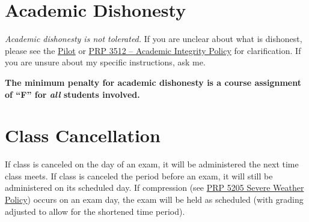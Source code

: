 \documentclass[11pt,letterpaper]{article}
\begin{document}
\begin{enumerate}
\end{enumerate}

\section{Academic Dishonesty}
\emph{Academic dishonesty is not tolerated.} If you are unclear about what is
dishonest, please see the
\href{https://intranet.bloomu.edu/documents/student/Pilot.pdf}{Pilot} or
\href{https://intranet.bloomu.edu/policies_procedures/3512}{PRP 3512 --
	Academic Integrity Policy} for clarification. If you are unsure about
	my specific instructions, ask me.

\begin{mdframed}
	\centering\bfseries The minimum penalty for academic dishonesty is a
	course assignment of ``F'' for \emph{all} students involved.
\end{mdframed}

\section{Class Cancellation}
If class is canceled on the day of an exam, it will be administered the next
time class meets.  If class is canceled the period before an exam, it will
still be administered on its scheduled day. If compression (see
\href{https://intranet.bloomu.edu/policies_procedures/5205}{PRP 5205 Severe
Weather Policy}) occurs on an exam day, the exam will be held as scheduled (with
grading adjusted to allow for the shortened time period).
\end{document}
